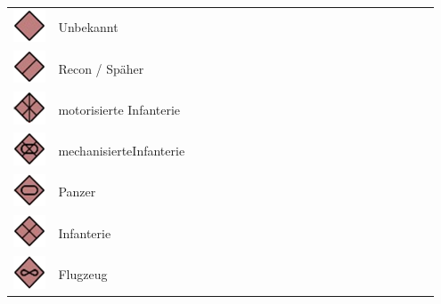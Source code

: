 \begin{longtable}{C{0.1\linewidth} m{0.85\linewidth}}
	\includegraphics[scale=0.8]{./img/fortgeschrittenes/karteUndMarkierungen/Unbekannt.png}	& 	Unbekannt \\
	\includegraphics[scale=0.8]{./img/fortgeschrittenes/karteUndMarkierungen/Recon.png}	& 	Recon / Späher \\
	\includegraphics[scale=0.8]{./img/fortgeschrittenes/karteUndMarkierungen/motorisierteInfanterie.png}	& 	motorisierte Infanterie \\
	\includegraphics[scale=0.8]{./img/fortgeschrittenes/karteUndMarkierungen/mechanisierteInfanterie.png}	& 	mechanisierteInfanterie\\
	\includegraphics[scale=0.8]{./img/fortgeschrittenes/karteUndMarkierungen/Panzer.png}	& 	Panzer \\
	\includegraphics[scale=0.8]{./img/fortgeschrittenes/karteUndMarkierungen/Infanterie.png}	& 	Infanterie \\
	\includegraphics[scale=0.8]{./img/fortgeschrittenes/karteUndMarkierungen/Flugzeug.png}	& 	Flugzeug \\

\end{longtable}
